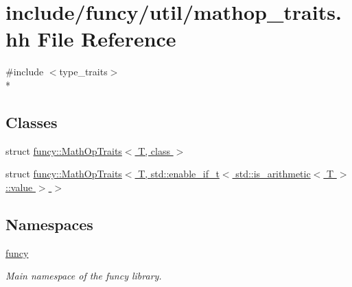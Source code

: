 \hypertarget{mathop__traits_8hh}{\section{include/funcy/util/mathop\-\_\-traits.hh File Reference}
\label{mathop__traits_8hh}
}
{\ttfamily \#include $<$type\-\_\-traits$>$}\\*
\subsection*{Classes}
\begin{DoxyCompactItemize}
\item 
struct \hyperlink{structfuncy_1_1MathOpTraits}{funcy\-::\-Math\-Op\-Traits$<$ T, class $>$}
\item 
struct \hyperlink{structfuncy_1_1MathOpTraits_3_01T_00_01std_1_1enable__if__t_3_01std_1_1is__arithmetic_3_01T_01_4_1_1value_01_4_01_4}{funcy\-::\-Math\-Op\-Traits$<$ T, std\-::enable\-\_\-if\-\_\-t$<$ std\-::is\-\_\-arithmetic$<$ T $>$\-::value $>$ $>$}
\end{DoxyCompactItemize}
\subsection*{Namespaces}
\begin{DoxyCompactItemize}
\item 
\hyperlink{namespacefuncy}{funcy}
\begin{DoxyCompactList}\small\item\em Main namespace of the funcy library. \end{DoxyCompactList}\end{DoxyCompactItemize}
